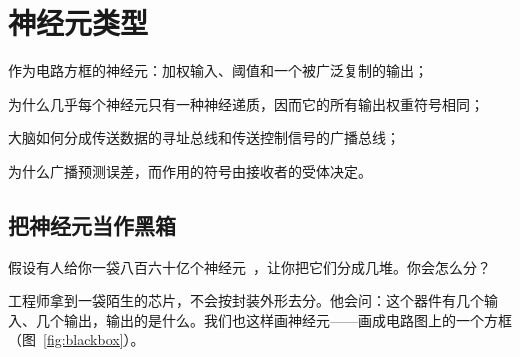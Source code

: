 \chapter{神经元类型}
\label{sec:neurontypes}
\begin{chaptergoals}
\item 作为电路方框的神经元：加权输入、阈值和一个被广泛复制的输出；
\item 为什么几乎每个神经元只有一种神经递质，因而它的所有输出权重符号相同；
\item 大脑如何分成传送数据的寻址总线和传送控制信号的广播总线；
\item 为什么广播预测误差，而作用的符号由接收者的受体决定。
\end{chaptergoals}

\section{把神经元当作黑箱}

假设有人给你一袋八百六十亿个神经元~\cite{Azevedo2009}，让你把它们分成几堆。你会怎么分？

工程师拿到一袋陌生的芯片，不会按封装外形去分。他会问：这个器件有几个输入、几个输出，输出的是什么。我们也这样画神经元——画成电路图上的一个方框（图~\ref{fig:blackbox}）。

